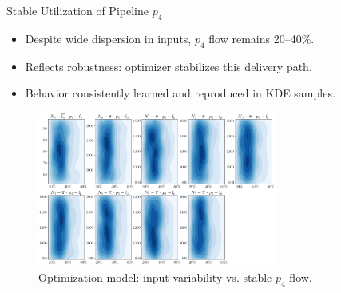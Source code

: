 \documentclass[hyperref={colorlinks,citecolor=blue,linkcolor=blue,urlcolor=blue}]{beamer}
\begin{document}
\begin{frame}{Stable Utilization of Pipeline $p_4$}
    \begin{itemize}
        \item Despite wide dispersion in inputs, $p_4$ flow remains 20--40\%.
        \item Reflects robustness: optimizer stabilizes this delivery path.
        \item Behavior consistently learned and reproduced in KDE samples.
    \end{itemize}
    \begin{figure}
        \includegraphics[width=0.7\textwidth]{figures/inputs_outputs_1.png}
        \caption*{Optimization model: input variability vs. stable $p_4$ flow.}
    \end{figure}
\end{frame}
\end{document}
